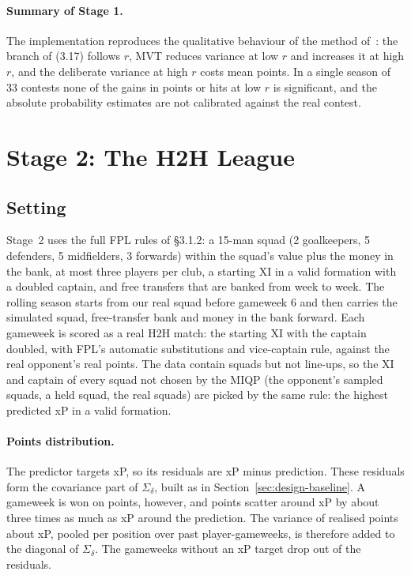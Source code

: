 \documentclass[12pt,oneside,a4paper]{book}
\theoremstyle{definition}
\theoremstyle{remark}
\begin{document}
	\paragraph{Summary of Stage 1.} The implementation reproduces the qualitative behaviour of the
	method of~\cite{haugh2021}: the branch of (3.17) follows $r$, MVT reduces variance at low $r$
	and increases it at high $r$, and the deliberate variance at high $r$ costs mean points. In a
	single season of 33 contests none of the gains in points or hits at low $r$ is significant,
	and the absolute probability estimates are not calibrated against the real contest.

	\section{Stage 2: The H2H League}
	\label{sec:s2}

	\subsection{Setting}
	\label{sec:s2-setting}

	Stage~2 uses the full FPL rules of §3.1.2: a 15-man squad (2 goalkeepers, 5 defenders, 5
	midfielders, 3 forwards) within the squad's value plus the money in the bank, at most three
	players per club, a starting XI in a valid formation with a doubled captain, and free transfers
	that are banked from week to week. The rolling season starts from our real squad before
	gameweek 6 and then carries the simulated squad, free-transfer bank and money in the bank
	forward. Each gameweek is scored as a real H2H match: the starting XI with the captain doubled,
	with FPL's automatic substitutions and vice-captain rule, against the real opponent's real
	points. The data contain squads but not line-ups, so the XI and captain of every squad not
	chosen by the MIQP (the opponent's sampled squads, a held squad, the real squads) are picked by
	the same rule: the highest predicted xP in a valid formation.

	\paragraph{Points distribution.} The predictor targets xP, so its residuals are xP minus
	prediction. These residuals form the covariance part of $\Sigma_\delta$, built as in
	Section~\ref{sec:design-baseline}. A gameweek is won on points, however, and points scatter
	around xP by about three times as much as xP around the prediction. The variance of realised
	points about xP, pooled per position over past player-gameweeks, is therefore added to the
	diagonal of $\Sigma_\delta$. The gameweeks without an xP target drop out of the residuals.
\end{document}
